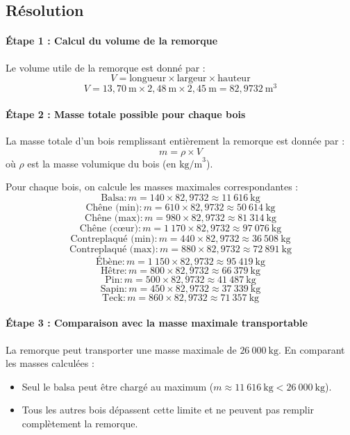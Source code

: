 \documentclass[a4paper,12pt]{article}
\begin{document}
\subsection*{Résolution}
\paragraph{Étape 1 : Calcul du volume de la remorque}
Le volume utile de la remorque est donné par :
\[
V = \text{longueur} \times \text{largeur} \times \text{hauteur}
\]
\[
V = 13,70~\text{m} \times 2,48~\text{m} \times 2,45~\text{m} = 82,9732~\text{m}^3
\]

\paragraph{Étape 2 : Masse totale possible pour chaque bois}
La masse totale d'un bois remplissant entièrement la remorque est donnée par :
\[
m = \rho \times V
\]
où $\rho$ est la masse volumique du bois (en $\text{kg/m}^3$).

Pour chaque bois, on calcule les masses maximales correspondantes :
\[
\text{Balsa} : m = 140 \times 82,9732 \approx 11~616~\text{kg}
\]
\[
\text{Chêne (min)} : m = 610 \times 82,9732 \approx 50~614~\text{kg}
\]
\[
\text{Chêne (max)} : m = 980 \times 82,9732 \approx 81~314~\text{kg}
\]
\[
\text{Chêne (cœur)} : m = 1~170 \times 82,9732 \approx 97~076~\text{kg}
\]
\[
\text{Contreplaqué (min)} : m = 440 \times 82,9732 \approx 36~508~\text{kg}
\]
\[
\text{Contreplaqué (max)} : m = 880 \times 82,9732 \approx 72~891~\text{kg}
\]
\[
\text{Ébène} : m = 1~150 \times 82,9732 \approx 95~419~\text{kg}
\]
\[
\text{Hêtre} : m = 800 \times 82,9732 \approx 66~379~\text{kg}
\]
\[
\text{Pin} : m = 500 \times 82,9732 \approx 41~487~\text{kg}
\]
\[
\text{Sapin} : m = 450 \times 82,9732 \approx 37~339~\text{kg}
\]
\[
\text{Teck} : m = 860 \times 82,9732 \approx 71~357~\text{kg}
\]

\paragraph{Étape 3 : Comparaison avec la masse maximale transportable}
La remorque peut transporter une masse maximale de $26~000~\text{kg}$. En comparant les masses calculées :
\begin{itemize}
    \item Seul le balsa peut être chargé au maximum ($m \approx 11~616~\text{kg} < 26~000~\text{kg}$).
    \item Tous les autres bois dépassent cette limite et ne peuvent pas remplir complètement la remorque.
\end{itemize}
\end{document}
